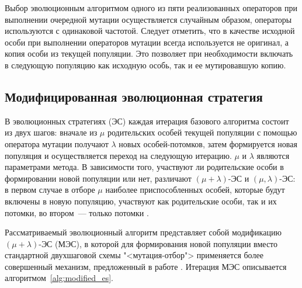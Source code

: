 \documentclass[12pt]{article}
\begin{document}
Выбор эволюционным алгоритмом одного из пяти реализованных операторов при 
выполнении очередной мутации осуществляется случайным образом, операторы 
используются с одинаковой частотой. Следует отметить, что в качестве исходной 
особи при выполнении операторов мутации всегда используется не оригинал, а 
копия особи из текущей популяции. Это позволяет при необходимости включать в 
следующую популяцию как исходную особь, так и ее мутировавшую копию.

\subsection{Модифицированная эволюционная стратегия}

В эволюционных стратегиях (ЭС) каждая итерация базового алгоритма состоит из 
двух шагов: вначале из $\mu$ родительских особей текущей популяции с помощью 
оператора мутации получают $\lambda$ новых особей-потомков, затем формируется 
новая популяция и осуществляется переход на следующую итерацию. $\mu$ и 
$\lambda$ являются параметрами метода. В зависимости того, участвуют ли 
родительские особи в формировании новой популяции или нет, различают 
$(\mu + \lambda)$-ЭС и $(\mu, \lambda)$-ЭС: в первом случае в отборе $\mu$ 
наиболее приспособленных особей, которые будут включены в новую популяцию, 
участвуют как родительские особи, так и их потомки, во втором~--- только 
потомки 
\cite{schwefel95}. 

Рассматриваемый эволюционный алгоритм представляет собой модификацию 
$(\mu + \lambda)$-ЭС (МЭС), в которой для формирования новой популяции вместо 
стандартной двухшаговой схемы "<мутация-отбор"> применяется более совершенный 
механизм, предложенный в работе 
\cite[с.~62]{michalewicz98}.
Итерация МЭС описывается алгоритмом~\ref{alg:modified_es}.
\end{document}
